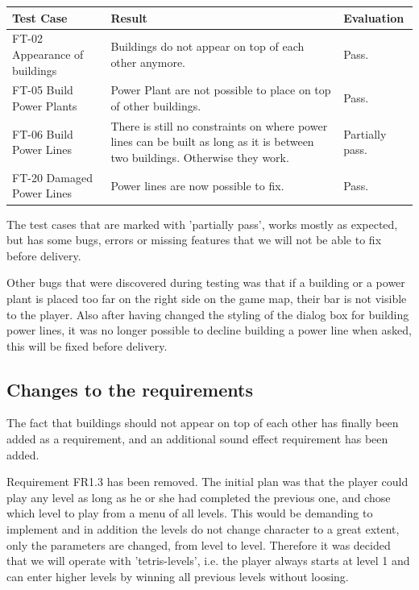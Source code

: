 	\begin{tabular}{| p{3cm} | p{7cm} | p{2cm} |}
		\hline
		\rowcolor{lightgray}
		{\bf Test Case} & {\bf Result} & {\bf Evaluation} \\ \hline
		
		FT-02 Appearance of buildings & Buildings do not appear on top of each other anymore. & Pass. \\ \hline
		
		FT-05 Build Power Plants & Power Plant are not possible to place on top of other buildings. & Pass. \\ \hline
		
		FT-06 Build Power Lines & There is still no constraints on where power lines can be built as long as it is between two buildings. Otherwise they work. & Partially pass. \\ \hline
		
		FT-20 Damaged Power Lines & Power lines are now possible to fix. & Pass. \\ \hline
	\end{tabular}

	The test cases that are marked with 'partially pass', works mostly as expected, but has some bugs, errors or missing features that we will not be able to fix before delivery.

	Other bugs that were discovered during testing was that if a building or a power plant is placed 
	too far on the right side on the game map, their bar is not visible to the player. Also after having 
	changed the styling of the dialog box for building power lines, it was no longer possible to decline 
	building a power line when asked, this will be fixed before delivery.

\subsection{Changes to the requirements}

	The fact that buildings should not appear on top of each other has finally been added as a requirement, and an additional sound effect requirement has been added.

	Requirement FR1.3 has been removed. The initial plan was that the player could play any level as long as he or she had completed the previous one, and chose which level to play from a menu of all levels. This would be demanding to implement and in addition the levels do not change character to a great extent, only the parameters are changed, from level to level. Therefore it was decided that we will operate with 'tetris-levels', i.e. the player always starts at level 1 and can enter higher levels by winning all previous levels without loosing. 

